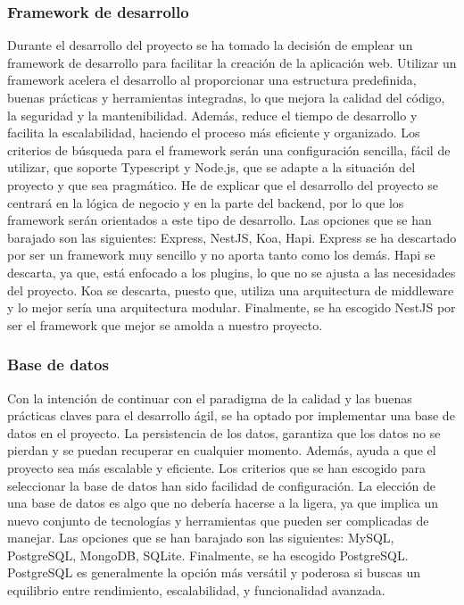 \subsubsection*{Framework de desarrollo}
Durante el desarrollo del proyecto se ha tomado la decisión de emplear un framework de desarrollo para facilitar la creación de la aplicación web.
Utilizar un framework acelera el desarrollo al proporcionar una estructura predefinida, buenas prácticas y herramientas integradas, lo que mejora la calidad del código, la seguridad y la mantenibilidad.
Además, reduce el tiempo de desarrollo y facilita la escalabilidad, haciendo el proceso más eficiente y organizado.
Los criterios de búsqueda para el framework serán una configuración sencilla, fácil de utilizar, que soporte Typescript y Node.js, que se adapte a la situación del proyecto y que sea pragmático.
He de explicar que el desarrollo del proyecto se centrará en la lógica de negocio y en la parte del backend, por lo que los framework serán orientados a este tipo de desarrollo.
Las opciones que se han barajado son las siguientes: Express, NestJS, Koa, Hapi. Express se ha descartado por ser un framework muy sencillo y no aporta tanto como los demás.
Hapi se descarta, ya que, está enfocado a los plugins, lo que no se ajusta a las necesidades del proyecto. Koa se descarta, puesto que, utiliza una arquitectura de middleware y lo mejor sería una arquitectura modular.
Finalmente, se ha escogido NestJS por ser el framework que mejor se amolda a nuestro proyecto.


\subsubsection*{Base de datos}
Con la intención de continuar con el paradigma de la calidad y las buenas prácticas claves para el desarrollo ágil, se ha optado
por implementar una base de datos en el proyecto. La persistencia de los datos, garantiza que los datos no se pierdan y se puedan recuperar en cualquier momento.
Además, ayuda a que el proyecto sea más escalable y eficiente. Los criterios que se han escogido para seleccionar la base de datos han sido facilidad de configuración.
La elección de una base de datos es algo que no debería hacerse a la ligera, ya que implica un nuevo conjunto de tecnologías y herramientas que pueden ser complicadas de manejar.
Las opciones que se han barajado son las siguientes: MySQL, PostgreSQL, MongoDB, SQLite. Finalmente, se ha escogido PostgreSQL.
PostgreSQL es generalmente la opción más versátil y poderosa si buscas un equilibrio entre rendimiento, escalabilidad, y funcionalidad avanzada.

